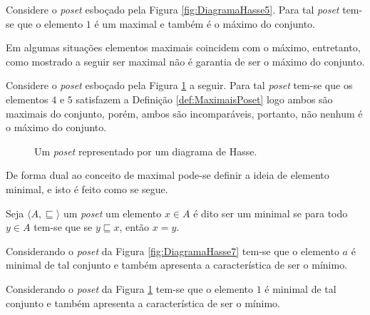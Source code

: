 \begin{example}
	Considere o \textit{poset} esboçado pela Figura \ref{fig:DiagramaHasse5}. Para tal \textit{poset} tem-se que o elemento $1$ é um maximal e também é o máximo do conjunto.
\end{example}

Em algumas situações elementos maximais coincidem com o máximo, entretanto, como mostrado a seguir ser maximal não é garantia de ser o máximo do conjunto.

\begin{example}
	Considere o \textit{poset} esboçado pela Figura \ref{fig:DiagramaHasse8} a seguir. Para tal \textit{poset} tem-se que os elementos $4$ e $5$ satisfazem a Definição \ref{def:MaximaisPoset} logo ambos são maximais do conjunto, porém, ambos são incomparáveis, portanto, não nenhum é o máximo do conjunto.
	
	\begin{figure}[h]
		\centering
		\caption{Um \textit{poset} representado por um diagrama de Hasse.}
		\label{fig:DiagramaHasse8}
	\end{figure}
\end{example} 

De forma dual ao conceito de maximal pode-se definir a ideia de elemento minimal, e isto é feito como se segue.

\begin{definition}\label{def:MinimalPoset}
	Seja $\langle A, \sqsubseteq \rangle$ um \textit{poset}  um elemento $x \in A$ é dito ser um minimal se para todo $y \in A$ tem-se que se $y\sqsubseteq x$, então $x = y$.
\end{definition}

\begin{example}
	Considerando o \textit{poset} da Figura \ref{fig:DiagramaHasse7} tem-se que o elemento $a$ é minimal de tal conjunto e também apresenta a característica de ser o mínimo.
\end{example}

\begin{example}
	Considerando o \textit{poset} da Figura \ref{fig:DiagramaHasse8} tem-se que o elemento $1$ é minimal de tal conjunto e também apresenta a característica de ser o mínimo.
\end{example}


